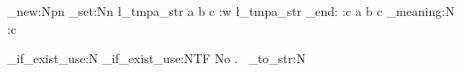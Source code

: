 \documentclass{article}
\begin{document}
\ExplSyntaxOn
\cs_new:Npn 
\str_set:Nn \l_tmpa_str { a b c }
\cs:w \l_tmpa_str \cs_end: %
\use:c { a b c } %
\cs_meaning:N \use:c \par
\cs_if_exist_use:N \abc
\cs_if_exist_use:NTF  { No } .~
\cs_to_str:N \abc
\ExplSyntaxOff
\end{document}
